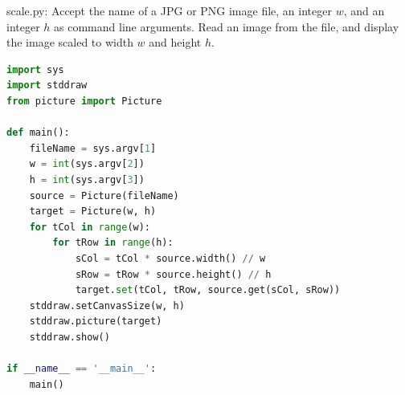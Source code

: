 \documentclass[8pt,a4paper,compress,handout]{beamer}
\begin{document}
\begin{frame}[fragile]
\begin{framed}
\tiny scale.py: Accept the name of a JPG or PNG image file, an integer $w$, and an integer $h$ as command line arguments. Read an image from the
file, and display the image scaled to width $w$ and height $h$.
\end{framed}

\begin{lstlisting}[language=Python]
import sys
import stddraw
from picture import Picture

def main():
    fileName = sys.argv[1]
    w = int(sys.argv[2])
    h = int(sys.argv[3])
    source = Picture(fileName)
    target = Picture(w, h)
    for tCol in range(w):
        for tRow in range(h):
            sCol = tCol * source.width() // w
            sRow = tRow * source.height() // h
            target.set(tCol, tRow, source.get(sCol, sRow))
    stddraw.setCanvasSize(w, h)
    stddraw.picture(target)
    stddraw.show()

if __name__ == '__main__':
    main()
\end{lstlisting}
\end{frame}
\end{document}
